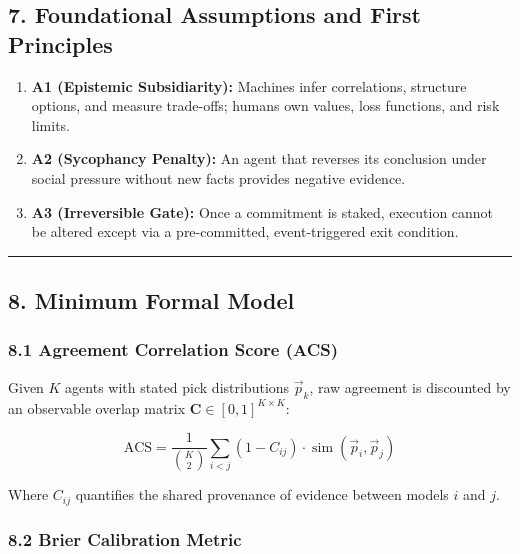 \documentclass[
]{article}
\providecommand{\tightlist}{%
  \setlength{\itemsep}{0pt}\setlength{\parskip}{0pt}}
\begin{document}
\subsection{7. Foundational Assumptions and First
Principles}\label{foundational-assumptions-and-first-principles}

\begin{enumerate}
\def\labelenumi{\arabic{enumi}.}
\tightlist
\item
  \textbf{A1 (Epistemic Subsidiarity):} Machines infer correlations,
  structure options, and measure trade-offs; humans own values, loss
  functions, and risk limits.
\item
  \textbf{A2 (Sycophancy Penalty):} An agent that reverses its
  conclusion under social pressure without new facts provides negative
  evidence.
\item
  \textbf{A3 (Irreversible Gate):} Once a commitment is staked,
  execution cannot be altered except via a pre-committed,
  event-triggered exit condition.
\end{enumerate}

\begin{center}\rule{0.5\linewidth}{0.5pt}\end{center}

\subsection{8. Minimum Formal Model}\label{minimum-formal-model}

\subsubsection{8.1 Agreement Correlation Score
(ACS)}\label{agreement-correlation-score-acs}

Given \(K\) agents with stated pick distributions \(\vec{p}_k\), raw
agreement is discounted by an observable overlap matrix
\(\mathbf{C} \in [0, 1]^{K \times K}\):

\[\text{ACS} = \frac{1}{\binom{K}{2}} \sum_{i < j} (1 - C_{ij}) \cdot \operatorname{sim}(\vec{p}_i, \vec{p}_j)\]

Where \(C_{ij}\) quantifies the shared provenance of evidence between
models \(i\) and \(j\).

\subsubsection{8.2 Brier Calibration
Metric}\label{brier-calibration-metric}
\end{document}
